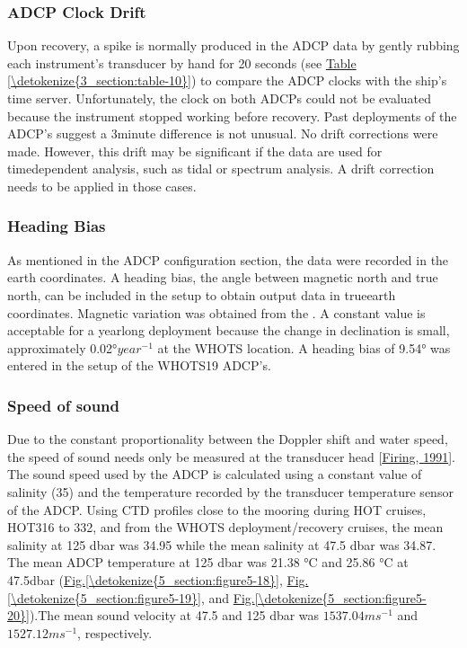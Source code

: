 \documentclass[a4paper,10pt,english,openany,oneside]{sphinxmanual}
\begin{document}
\subsubsection{ADCP Clock Drift}
\label{\detokenize{5_section:adcp-clock-drift}}
\sphinxAtStartPar
Upon recovery, a spike is normally produced in the ADCP data by gently rubbing
each instrument’s transducer by hand for 20 seconds (see \hyperref[\detokenize{3_section:table-10}]{Table \ref{\detokenize{3_section:table-10}}}) to
compare the ADCP clocks with the ship’s time server. Unfortunately, the clock
on both ADCPs could not be evaluated because the instrument stopped working
before recovery. Past deployments of the ADCP’s suggest a 3\sphinxhyphen{}minute difference
is not unusual. No drift corrections were made. However, this drift may be
significant if the data are used for time\sphinxhyphen{}dependent analysis, such as tidal or
spectrum analysis. A drift correction needs to be applied in those cases.


\subsubsection{Heading Bias}
\label{\detokenize{5_section:heading-bias}}
\sphinxAtStartPar
As mentioned in the ADCP configuration section, the data were recorded in the
earth coordinates. A heading bias, the angle between magnetic north and true
north, can be included in the setup to obtain output data in true\sphinxhyphen{}earth
coordinates. Magnetic variation was obtained from the
. A constant value is acceptable for a yearlong deployment because the change
in declination is small, approximately \sphinxhyphen{}0.02°\(year^{-1}\) at the
WHOTS
location. A heading bias of 9.54° was entered in the setup of the WHOTS\sphinxhyphen{}19
ADCP’s.


\subsubsection{Speed of sound}
\label{\detokenize{5_section:speed-of-sound}}
\sphinxAtStartPar
Due to the constant proportionality between the Doppler shift and water speed,
the speed of sound needs only be measured at the transducer head
{[}\hyperlink{cite.references:id3}{Firing, 1991}{]}. The sound speed used by the ADCP is calculated using a
constant value of salinity (35) and the temperature recorded by the transducer
temperature sensor of the ADCP. Using CTD profiles close to the mooring during
HOT cruises, HOT\sphinxhyphen{}316 to 332, and from the WHOTS deployment/recovery cruises,
the mean salinity at 125 dbar was 34.95 while the mean salinity at 47.5 dbar
was 34.87. The mean ADCP temperature at 125 dbar was 21.38 °C and 25.86 °C at
47.5dbar
(\hyperref[\detokenize{5_section:figure5-18}]{Fig.\@ \ref{\detokenize{5_section:figure5-18}}}, \hyperref[\detokenize{5_section:figure5-19}]{Fig.\@ \ref{\detokenize{5_section:figure5-19}}}, and \hyperref[\detokenize{5_section:figure5-20}]{Fig.\@ \ref{\detokenize{5_section:figure5-20}}}).The mean
sound velocity at 47.5 and 125 dbar was \(1537.04 ms^{-1}\) and
\(1527.12 ms^{-1}\), respectively.
\end{document}
